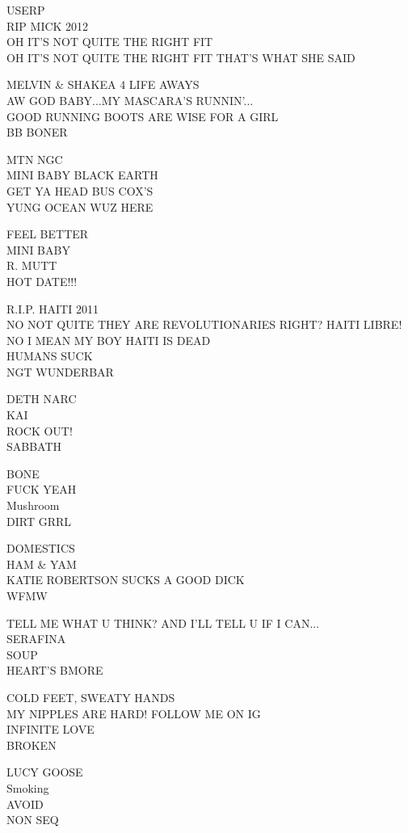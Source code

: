 \documentclass[10pt,letterpaper]{article}
\begin{document}
USERP\\
RIP MICK 2012\\
OH IT'S NOT QUITE THE RIGHT FIT\\
OH IT'S NOT QUITE THE RIGHT FIT THAT'S WHAT SHE SAID

MELVIN \& SHAKEA 4 LIFE AWAYS\\
AW GOD BABY...MY MASCARA'S RUNNIN'...\\
GOOD RUNNING BOOTS ARE WISE FOR A GIRL\\
BB BONER

MTN NGC\\
MINI BABY BLACK EARTH\\
GET YA HEAD BUS COX'S\\
YUNG OCEAN WUZ HERE

FEEL BETTER\\
MINI BABY\\
R. MUTT\\
HOT DATE!!!

R.I.P. HAITI 2011\\
NO NOT QUITE THEY ARE REVOLUTIONARIES RIGHT?  HAITI LIBRE!  NO I MEAN MY BOY HAITI IS DEAD\\
HUMANS SUCK\\
NGT WUNDERBAR

DETH NARC\\
KAI\\
ROCK OUT!\\
SABBATH

BONE\\
FUCK YEAH\\
Mushroom\\
DIRT GRRL

DOMESTICS\\
HAM \& YAM\\
KATIE ROBERTSON SUCKS A GOOD DICK\\
WFMW

TELL ME WHAT U THINK?  AND I'LL TELL U IF I CAN...\\
SERAFINA\\
SOUP\\
HEART'S BMORE

COLD FEET, SWEATY HANDS\\
MY NIPPLES ARE HARD!  FOLLOW ME ON IG\\
INFINITE LOVE\\
BROKEN

LUCY GOOSE\\
Smoking\\
AVOID\\
NON SEQ
\end{document}
